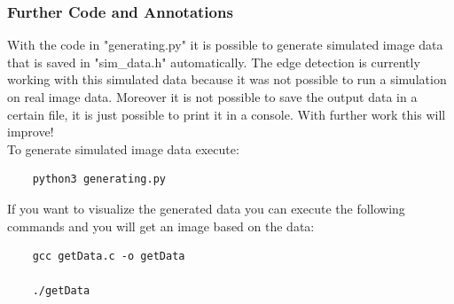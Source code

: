 \documentclass{article}
\begin{document}
{\subsubsection*{Further Code and Annotations}
With the code in "generating.py" it is possible to generate simulated image data that is saved in "sim\_data.h" automatically. The edge detection is currently working with this 
simulated data because it was not possible to run a simulation on real image data. Moreover it is not possible to save the output data in a certain file, it is just possible to print it in a console.
With further work this will improve!\\
To generate simulated image data execute:
\begin{verbatim}
    python3 generating.py
\end{verbatim}
If you want to visualize the generated data you can execute the following commands and you will get an image based on the data:
\begin{verbatim}
    gcc getData.c -o getData

    ./getData
\end{verbatim}
 
}
\end{document}
